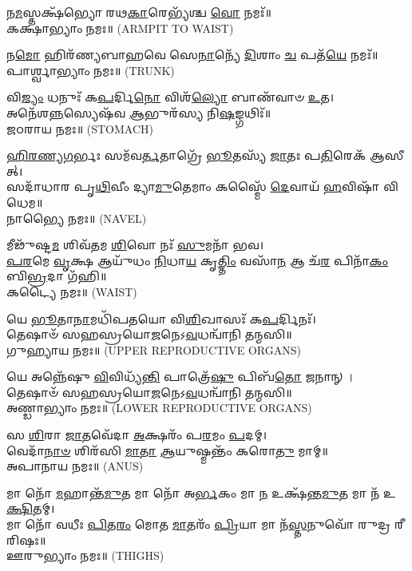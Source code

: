 𑌨\-\ul{𑌮}\-𑌸𑍍𑌤𑌕𑍍𑌷᳴𑌭𑍍𑌯𑍋 𑌰𑌥\-\ul{𑌕𑌾}\-𑌰𑍇𑌭𑍍𑌯᳴𑌶𑍍𑌚 \ul{𑌵𑍋} 𑌨𑌮𑌃᳴॥\\
𑌕𑌕𑍍𑌷𑌾𑌭𑍍𑌯𑌾𑌂 𑌨𑌮𑌃॥ {\scriptsize (ARMPIT TO WAIST)}

𑌨\-\ul{𑌮𑍋} 𑌹𑌿𑌰᳴𑌣𑍍𑌯𑌬𑌾𑌹𑌵𑍇 𑌸𑍇\-\ul{𑌨𑌾}\-𑌨𑍍𑌯𑍇᳴ \ul{𑌦𑌿}\-𑌶𑌾𑌂 \ul{𑌚} 𑌪𑌤᳴\-\ul{𑌯𑍇} 𑌨𑌮𑌃᳴॥\\
𑌪𑌾𑌰𑍍𑌶𑍍𑌵𑌾𑌭𑍍𑌯𑌾𑌂 𑌨𑌮𑌃॥ {\scriptsize (TRUNK)}

 𑌵𑌿\-\ul{𑌜𑍍𑌯𑌂} 𑌧𑌨𑍁𑌃᳴ 𑌕\-\ul{𑌪}\-𑌰𑍍𑌦𑌿\-\ul{𑌨𑍋} 𑌵𑌿𑌶᳴\-\ul{𑌲𑍍𑌯𑍋} 𑌬𑌾𑌣᳴𑌵𑌾𑍞 \ul{𑌉}\-𑌤।\\
 𑌅𑌨𑍇᳴𑌶\-\ul{𑌨𑍍𑌨}\-𑌸𑍍𑌯𑍇𑌷᳴𑌵 \ul{𑌆}\-𑌭𑍁𑌰᳴𑌸𑍍𑌯 𑌨𑌿\-\ul{𑌷}\-𑌙𑍍𑌗𑌥𑌿𑌃᳴॥\\
𑌜𑌠𑌰𑌾𑌯 𑌨𑌮𑌃॥ {\scriptsize (STOMACH)}


\-\ul{𑌹𑌿}\-\-\ul{𑌰}\-\-\ul{𑌣𑍍𑌯}\-\-\ul{𑌗}\-𑌰𑍍𑌭𑌃 𑌸𑌮᳴𑌵\-\ul{𑌰𑍍𑌤}\-𑌤𑌾𑌗𑍍𑌰𑍇᳴ \ul{𑌭𑍂}\-𑌤𑌸𑍍𑌯᳴ \ul{𑌜𑌾}\-𑌤𑌃 𑌪\-\ul{𑌤𑌿}\-𑌰𑍇𑌕᳴ 𑌆𑌸𑍀𑌤𑍍।\\
𑌸𑌦𑌾᳴𑌧𑌾𑌰 𑌪𑍃\-\ul{𑌥𑌿}\-𑌵𑍀𑌂 𑌦𑍍𑌯𑌾\-\ul{𑌮𑍁}\-𑌤𑍇𑌮𑌾𑌂 𑌕𑌸𑍍𑌮𑍈᳴ \ul{𑌦𑍇}\-𑌵𑌾𑌯᳴ \ul{𑌹}\-𑌵𑌿𑌷𑌾᳴ 𑌵𑌿𑌧𑍇𑌮॥\\
𑌨𑌾𑌭𑍍𑌯𑍈 𑌨𑌮𑌃॥ {\scriptsize (NAVEL)}

𑌮𑍀𑌢𑍁᳴𑌷𑍍𑌟\-\ul{𑌮} 𑌶𑌿𑌵᳴𑌤𑌮 \ul{𑌶𑌿}\-𑌵𑍋 𑌨𑌃᳴ \ul{𑌸𑍁}\-𑌮𑌨𑌾᳴ 𑌭𑌵।\\
 \ul{𑌪}\-\-\ul{𑌰}\-𑌮𑍇 \ul{𑌵𑍃}\-𑌕𑍍𑌷 𑌆𑌯𑍁᳴𑌧𑌂 \ul{𑌨𑌿}\-𑌧𑌾\-\ul{𑌯} 𑌕𑍃\-\ul{𑌤𑍍𑌤𑌿𑌂} 𑌵𑌸𑌾᳴\-\ul{𑌨} 𑌆 𑌚᳴\-\ul{𑌰} 𑌪𑌿𑌨𑌾᳴\-\ul{𑌕𑌂} 𑌬𑌿\-\ul{𑌭𑍍𑌰}\-𑌦𑌾 𑌗᳴𑌹𑌿॥\\
𑌕𑌟𑍍𑌯𑍈 𑌨𑌮𑌃॥ {\scriptsize (WAIST)}

 𑌯𑍇 \ul{𑌭𑍂}\-𑌤𑌾\-\ul{𑌨𑌾}\-𑌮𑌧𑌿᳴𑌪𑌤𑌯𑍋 𑌵𑌿\-\ul{𑌶𑌿}\-𑌖𑌾𑌸𑌃᳴ 𑌕\-\ul{𑌪}\-𑌰𑍍𑌦𑌿𑌨𑌃᳴। \\
𑌤𑍇𑌷𑌾𑍞᳴ 𑌸𑌹𑌸𑍍𑌰𑌯𑍋\-\ul{𑌜}\-𑌨𑍇𑌽\-\ul{𑌵}\-𑌧𑌨𑍍𑌵𑌾᳴𑌨𑌿 𑌤𑌨𑍍𑌮𑌸𑌿॥ \\
𑌗𑍁𑌹𑍍𑌯𑌾𑌯 𑌨𑌮𑌃॥ {\scriptsize (UPPER REPRODUCTIVE ORGANS)}

𑌯𑍇 𑌅𑌨𑍍𑌨𑍇᳴𑌷𑍁 \ul{𑌵𑌿}\-𑌵𑌿𑌧𑍍𑌯᳴\-\ul{𑌨𑍍𑌤𑌿} 𑌪𑌾𑌤𑍍𑌰𑍇᳴\-\ul{𑌷𑍁} 𑌪𑌿𑌬᳴\-\ul{𑌤𑍋} 𑌜𑌨𑌾𑌨𑍍।\\
𑌤𑍇𑌷𑌾𑍞᳴ 𑌸𑌹𑌸𑍍𑌰𑌯𑍋\-\ul{𑌜}\-𑌨𑍇𑌽\-\ul{𑌵}\-𑌧𑌨𑍍𑌵𑌾᳴𑌨𑌿 𑌤𑌨𑍍𑌮𑌸𑌿॥ \\
𑌅𑌣𑍍𑌡𑌾𑌭𑍍𑌯𑌾𑌂 𑌨𑌮𑌃॥ {\scriptsize (LOWER REPRODUCTIVE ORGANS)}

𑌸 \ul{𑌶𑌿}\-𑌰𑌾 \ul{𑌜𑌾}\-𑌤𑌵𑍇᳴𑌦𑌾 \ul{𑌅}\-𑌕𑍍𑌷𑌰𑌂᳴ 𑌪\-\ul{𑌰}\-𑌮𑌂 \ul{𑌪}\-𑌦𑌮𑍍।\\
𑌵𑍇𑌦𑌾᳴\-\ul{𑌨𑌾}\-\-\ul{𑍞} 𑌶𑌿𑌰᳴𑌸𑌿 \ul{𑌮𑌾}\-\-\ul{𑌤𑌾} \ul{𑌆}\-𑌯𑍁𑌷𑍍𑌮𑌨𑍍𑌤𑌂᳴ 𑌕𑌰𑍋\-\ul{𑌤𑍁} 𑌮𑌾𑌮𑍍॥\\
𑌅𑌪𑌾𑌨𑌾𑌯 𑌨𑌮𑌃॥ {\scriptsize (ANUS)}

𑌮𑌾 𑌨𑍋᳴ \ul{𑌮}\-𑌹𑌾𑌨𑍍𑌤᳴\-\ul{𑌮𑍁}\-𑌤 𑌮𑌾 𑌨𑍋᳴ 𑌅\-\ul{𑌰𑍍𑌭}\-𑌕𑌂 𑌮𑌾 \ul{𑌨} 𑌉𑌕𑍍𑌷᳴𑌨𑍍𑌤\-\ul{𑌮𑍁}\-𑌤 𑌮𑌾 𑌨᳴ 𑌉\-\ul{𑌕𑍍𑌷𑌿}\-𑌤𑌮𑍍।\\
 𑌮𑌾 𑌨𑍋᳴ 𑌵𑌧𑍀𑌃 \ul{𑌪𑌿}\-𑌤\-\ul{𑌰𑌂} 𑌮𑍋𑌤 \ul{𑌮𑌾}\-𑌤𑌰𑌂᳴ \ul{𑌪𑍍𑌰𑌿}\-𑌯𑌾 𑌮𑌾 𑌨᳴\-\ul{𑌸𑍍𑌤}\-𑌨𑍁𑌵𑍋᳴ 𑌰𑍁𑌦𑍍𑌰 𑌰𑍀𑌰𑌿𑌷𑌃॥\\
𑌊𑌰𑍁𑌭𑍍𑌯𑌾𑌂 𑌨𑌮𑌃॥ {\scriptsize (THIGHS)}

